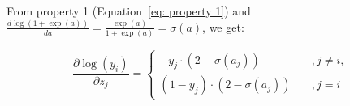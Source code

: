 From property 1 (Equation~\ref{eq: property 1})
and $\frac{d \log(1 + \exp(a))}{d a} = \frac{\exp(a)}{1 + \exp(a)} = \sigma(a)$, we get:

\begin{equation}
\frac{\partial \log(y_i)}{\partial z_j}
= \left\{
\begin{array}{ll}
-y_j \cdot (2 - \sigma(a_j))
 & \quad, j \neq i, \\
(1-y_j) \cdot (2 - \sigma(a_j))
 & \quad, j = i 
\end{array}
\right. 
\end{equation}




